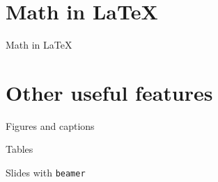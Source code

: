 \documentclass[xcolor={dvipsnames}]{beamer}
\begin{document}
\section{Math in \LaTeX}
\begin{frame}{Math in \LaTeX}
\end{frame}

\section{Other useful features}
\begin{frame}{Figures and captions}

\end{frame}

\begin{frame}{Tables}

\end{frame}

\begin{frame}{Slides with \texttt{beamer}}

\end{frame}
\end{document}
